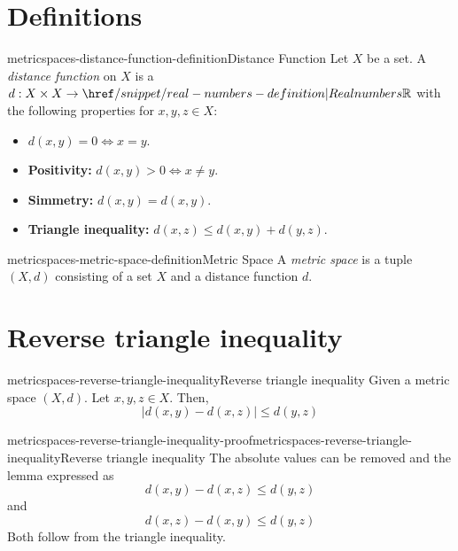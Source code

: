 \documentclass[preview]{standalone}
\begin{document}
\genpage

\section{Definitions}

\begin{snippetdefinition}{metricspaces-distance-function-definition}{Distance Function}
    Let \(X\) be a set.
    A \textit{distance function} on \(X\) is
    a \function \(d: X \times X \to \realnumbers\)
    with the following properties for \(x,y,z \in X\):
    \begin{itemize}
        \item \(d(x,y) = 0 \iff x = y\).
        \item \textbf{Positivity:} \(d(x,y) > 0 \iff x \neq y\).
        \item \textbf{Simmetry:} \(d(x,y) = d(x,y)\).
        \item \textbf{Triangle inequality:} \(d(x,z) \leq d(x,y) + d(y,z)\).
    \end{itemize}
\end{snippetdefinition}

\begin{snippetdefinition}{metricspaces-metric-space-definition}{Metric Space}
    A \textit{metric space} is a tuple \((X, d)\)
    consisting of a set \(X\) and a distance function \(d\). %
\end{snippetdefinition}

\section{Reverse triangle inequality}

\begin{snippetlemma}{metricspaces-reverse-triangle-inequality}{Reverse triangle inequality}
    Given a metric space \((X,d)\). Let \(x,y,z \in X\).
    Then, \[|d(x,y) - d(x,z)| \leq d(y,z)\]
\end{snippetlemma}

\begin{snippetproof}{metricspaces-reverse-triangle-inequality-proof}{metricspaces-reverse-triangle-inequality}{Reverse triangle inequality}
    The absolute values can be removed and the lemma expressed as
    \[
        d(x,y) - d(x,z) \leq d(y,z)
    \]
    and
    \[
        d(x,z) - d(x,y) \leq d(y,z)
    \]
    Both follow from the triangle inequality.
\end{snippetproof}
\end{document}
